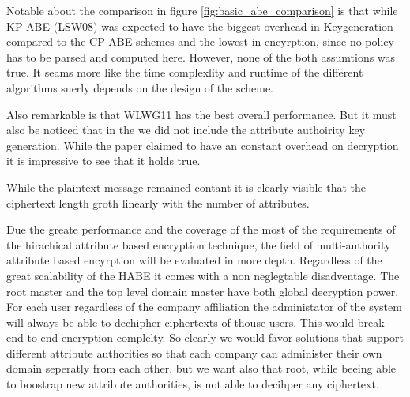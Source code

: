 Notable about the comparison in figure \ref{fig:basic_abe_comparison} is that while KP-ABE (LSW08) was expected to have the biggest overhead in Keygeneration compared to the CP-ABE schemes and the lowest in encyrption, since no policy has to be parsed and computed here. However, none of the both assumtions was true. It seams more like the time complexlity and runtime of the different algorithms suerly depends on the design of the scheme. 

Also remarkable is that WLWG11 has the best overall performance. But it must also be noticed that in the we did not include the attribute authoirity key generation. While the paper claimed to have an constant overhead on decryption it is impressive to see that it holds true. 

While the plaintext message remained contant it is clearly visible that the ciphertext length groth linearly with the number of attributes. 

Due the greate performance and the coverage of the most of the requirements of the hirachical attribute based encryption technique, the field of multi-authority attribute based encyrption will be evaluated in more depth. Regardless of the great scalability of the HABE it comes with a non neglegtable disadventage. The root master and the top level domain master have both global decryption power. For each user regardless of the company affiliation the administator of the system will always be able to dechipher ciphertexts of thouse users. This would break end-to-end encryption complelty. So clearly we would favor solutions that support different attribute authorities so that each company can administer their own domain seperatly from each other, but we want also that root, while beeing able to boostrap new attribute authorities, is not able to decihper any ciphertext. 


